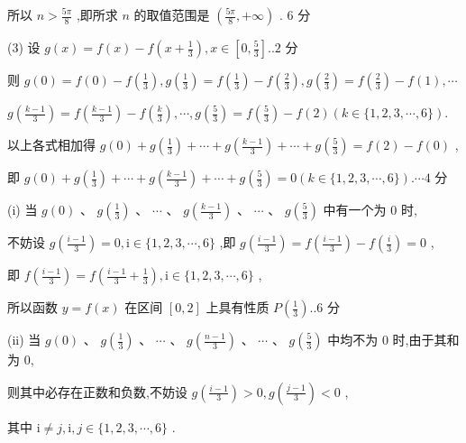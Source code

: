 \documentclass[10pt]{article}
\begin{document}
所以 \(n > \frac{5\pi }{8}\) ,即所求 \(n\) 的取值范围是 \(\left( {\frac{5\pi }{8}, + \infty }\right)\) . 6 分

(3) 设 \(g\left( x\right)  = f\left( x\right)  - f\left( {x + \frac{1}{3}}\right) ,x \in  \left\lbrack  {0,\frac{5}{3}}\right\rbrack  ..2\) 分

则 \(g\left( 0\right)  = f\left( 0\right)  - f\left( \frac{1}{3}\right) ,g\left( \frac{1}{3}\right)  = f\left( \frac{1}{3}\right)  - f\left( \frac{2}{3}\right) ,g\left( \frac{2}{3}\right)  = f\left( \frac{2}{3}\right)  - f\left( 1\right) ,\cdots\)

\(g\left( \frac{k - 1}{3}\right)  = f\left( \frac{k - 1}{3}\right)  - f\left( \frac{k}{3}\right) ,\cdots ,g\left( \frac{5}{3}\right)  = f\left( \frac{5}{3}\right)  - f\left( 2\right) \left( {k \in  \{ 1,2,3,\cdots ,6\} }\right) .\)

以上各式相加得 \(g\left( 0\right)  + g\left( \frac{1}{3}\right)  + \cdots  + g\left( \frac{k - 1}{3}\right)  + \cdots  + g\left( \frac{5}{3}\right)  = f\left( 2\right)  - f\left( 0\right)\) ,

即 \(g\left( 0\right)  + g\left( \frac{1}{3}\right)  + \cdots  + g\left( \frac{k - 1}{3}\right)  + \cdots  + g\left( \frac{5}{3}\right)  = 0\left( {k \in  \{ 1,2,3,\cdots ,6\} }\right) .\cdots 4\) 分

(i) 当 \(g\left( 0\right) \text{ 、 }g\left( \frac{1}{3}\right) \text{ 、 }\cdots \text{ 、 }g\left( \frac{k - 1}{3}\right) \text{ 、 }\cdots \text{ 、 }g\left( \frac{5}{3}\right)\) 中有一个为 0 时,

不妨设 \(g\left( \frac{i - 1}{3}\right)  = 0,\mathrm{i} \in  \{ 1,2,3,\cdots ,6\}\) ,即 \(g\left( \frac{i - 1}{3}\right)  = f\left( \frac{i - 1}{3}\right)  - f\left( \frac{i}{3}\right)  = 0\) ,

即 \(f\left( \frac{i - 1}{3}\right)  = f\left( {\frac{i - 1}{3} + \frac{1}{3}}\right) ,\mathrm{i} \in  \{ 1,2,3,\cdots ,6\}\) ,

所以函数 \(y = f\left( x\right)\) 在区间 \(\left\lbrack  {0,2}\right\rbrack\) 上具有性质 \(P\left( \frac{1}{3}\right) ..6\) 分

(ii) 当 \(g\left( 0\right) \text{ 、 }g\left( \frac{1}{3}\right) \text{ 、 }\cdots \text{ 、 }g\left( \frac{n - 1}{3}\right) \text{ 、 }\cdots \text{ 、 }g\left( \frac{5}{3}\right)\) 中均不为 0 时,由于其和为 0,

则其中必存在正数和负数,不妨设 \(g\left( \frac{i - 1}{3}\right)  > 0,g\left( \frac{j - 1}{3}\right)  < 0\) ,

其中 \(\mathrm{i} \neq  j,\mathrm{i},j \in  \{ 1,2,3,\cdots ,6\}\) .
\end{document}
